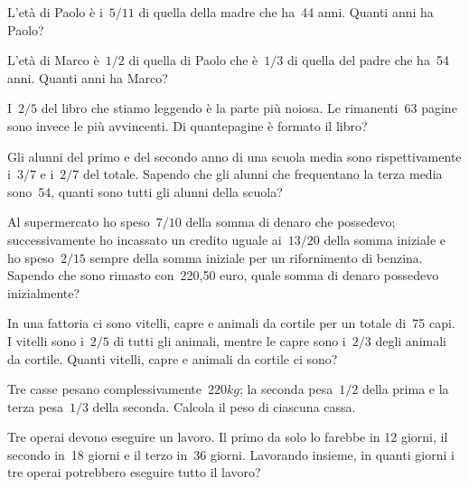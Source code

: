  \begin{multicols}{2}
\begin{esercizio}[\Ast]%
 L'età di Paolo è i~$5/11$ di quella della madre che ha~44 anni. Quanti anni ha Paolo?
\end{esercizio}

\begin{esercizio}[\Ast]%
L'età di Marco è~$1/2$ di quella di Paolo che è~$1/3$ di quella del padre che ha~54 anni. Quanti anni ha Marco?
\end{esercizio}

\begin{esercizio}[\Ast]%
I~$2/5$ del libro che stiamo leggendo è la parte più noiosa. Le rimanenti~63 pagine sono invece le più avvincenti.
Di quantepagine è formato il libro?
\end{esercizio}

\begin{esercizio}[\Ast]%
Gli alunni del primo e del secondo anno di una scuola media sono rispettivamente i~$3/7$ e i~$2/7$ del totale.
Sapendo che gli alunni che frequentano la terza media sono~54, quanti sono tutti gli alunni della scuola?
\end{esercizio}

\begin{esercizio}[\Ast]%
Al supermercato ho speso~$7/10$ della somma di denaro che possedevo;
successivamente ho incassato un credito uguale ai~$13/20$ della somma
iniziale e ho speso~$2/15$ sempre della somma iniziale per un
rifornimento di benzina. Sapendo che sono rimasto con~220,50 euro,
quale somma di denaro possedevo inizialmente?
\end{esercizio}

\begin{esercizio}[\Ast]%
 In una fattoria ci sono vitelli, capre e animali da cortile per
un totale di~75 capi. I vitelli sono i~$2/5$ di tutti gli animali,
mentre le capre sono i~$2/3$ degli animali da cortile. Quanti vitelli,
capre e animali da cortile ci sono?
\end{esercizio}

\begin{esercizio}[\Ast]%
 Tre casse pesano complessivamente~$220\unit{kg}$; la seconda pesa~$1/2$ della
prima e la terza pesa~$1/3$ della seconda. Calcola il peso di ciascuna
cassa.
\end{esercizio}

\begin{esercizio}[\Ast]%
 Tre operai devono eseguire un lavoro. Il primo da solo lo farebbe in
12 giorni, il secondo in~18 giorni e il terzo in~36 giorni. Lavorando
insieme, in quanti giorni i tre operai potrebbero eseguire tutto il
lavoro?
\end{esercizio}


\end{multicols}
